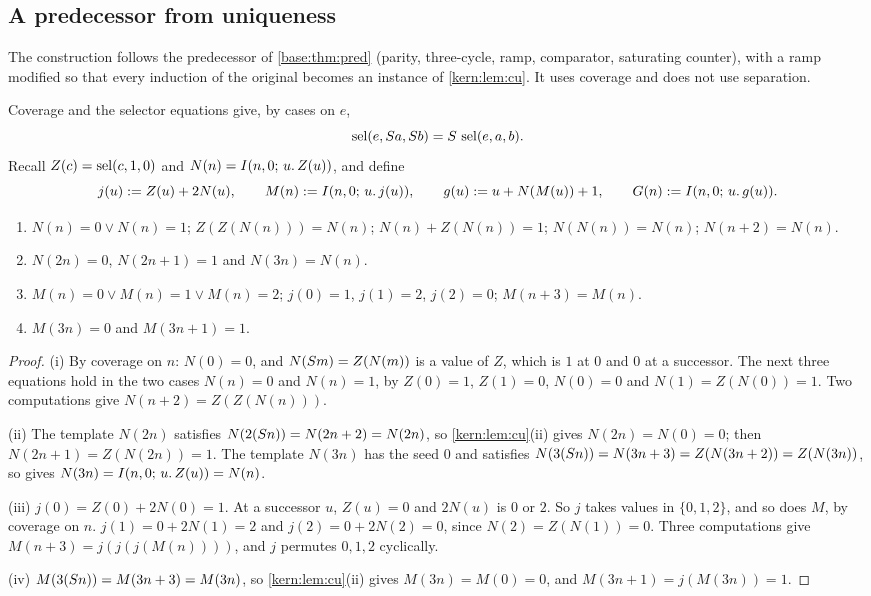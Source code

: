 \subsection{A predecessor from uniqueness}
\label{kern:sec:urpred}

The construction follows the predecessor of \cref{base:thm:pred} (parity,
three-cycle, ramp, comparator, saturating counter), with a ramp modified so
that every induction of the original becomes an instance of
\cref{kern:lem:cu}.  It uses coverage and does not use separation.

Coverage and the selector equations give, by cases on $e$,
\begin{equation}
 \operatorname{sel}(e,S a,S b)=S\,\operatorname{sel}(e,a,b). \label{kern:eq:selS}
\end{equation}
Recall $Z(c)=\operatorname{sel}(c,1,0)$ and $N(n)=I(n,0;\,u.\,Z(u))$, and define
\[
 j(u)\mathrel{:=} Z(u)+2N(u),\qquad M(n)\mathrel{:=}I(n,0;\,u.\,j(u)),\qquad
 g(u)\mathrel{:=} u+N(M(u))+1,\qquad G(n)\mathrel{:=}I(n,0;\,u.\,g(u)).
\]

\begin{lemma}
\label{kern:lem:clocks}
\begin{enumerate}[label=\textup{(\roman*)}]
\item $N(n)=0\vee N(n)=1$; $Z(Z(N(n)))=N(n)$; $N(n)+Z(N(n))=1$;
 $N(N(n))=N(n)$; $N(n+2)=N(n)$.
\item $N(2n)=0$, $N(2n+1)=1$ and $N(3n)=N(n)$.
\item $M(n)=0\vee M(n)=1\vee M(n)=2$; $j(0)=1$, $j(1)=2$, $j(2)=0$;
 $M(n+3)=M(n)$.
\item $M(3n)=0$ and $M(3n+1)=1$.
\end{enumerate}
\end{lemma}

\begin{proof}
(i) By coverage on $n$: $N(0)=0$, and $N(S m)=Z(N(m))$ is a value of
$Z$, which is $1$ at $0$ and $0$ at a successor.  The next three equations
hold in the two cases $N(n)=0$ and $N(n)=1$, by $Z(0)=1$, $Z(1)=0$,
$N(0)=0$ and $N(1)=Z(N(0))=1$.  Two computations give
$N(n+2)=Z(Z(N(n)))$.

(ii) The template $N(2n)$ satisfies $N(2(S n))=N(2n+2)=N(2n)$, so
\cref{kern:lem:cu}(ii) gives $N(2n)=N(0)=0$; then $N(2n+1)=Z(N(2n))=1$.
The template $N(3n)$ has the seed $0$ and satisfies
$N(3(S n))=N(3n+3)=Z(N(3n+2))=Z(N(3n))$, so  gives
$N(3n)=I(n,0;\,u.\,Z(u))=N(n)$.

(iii) $j(0)=Z(0)+2N(0)=1$.  At a successor $u$, $Z(u)=0$ and $2N(u)$ is $0$
or $2$.  So $j$ takes values in $\{0,1,2\}$, and so does $M$, by coverage
on $n$.  $j(1)=0+2N(1)=2$ and $j(2)=0+2N(2)=0$, since $N(2)=Z(N(1))=0$.
Three computations give $M(n+3)=j(j(j(M(n))))$, and $j$ permutes $0,1,2$
cyclically.

(iv) $M(3(S n))=M(3n+3)=M(3n)$, so \cref{kern:lem:cu}(ii) gives
$M(3n)=M(0)=0$, and $M(3n+1)=j(M(3n))=1$.
\end{proof}

